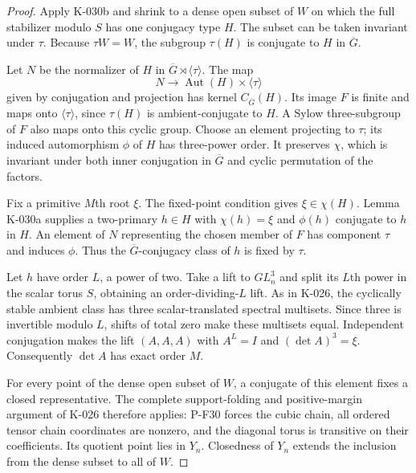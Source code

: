 \begin{proof}
Apply K-030b and shrink to a dense open subset of $W$ on which
the full stabilizer modulo $S$ has one conjugacy type $H$.
The subset can be taken invariant under $\tau$.  Because
$\tau W=W$, the subgroup $\tau(H)$ is conjugate to $H$ in
$\overline G$.

Let $N$ be the normalizer of $H$ in
$\overline G\rtimes\langle\tau\rangle$.  The map
\[
 N\longrightarrow \operatorname{Aut}(H)\times\langle\tau\rangle
\]
given by conjugation and projection has kernel
$C_{\overline G}(H)$.  Its image $F$ is finite and maps onto
$\langle\tau\rangle$, since $\tau(H)$ is ambient-conjugate to
$H$.  A Sylow three-subgroup of $F$ also maps onto this cyclic
group.  Choose an element projecting to $\tau$; its induced
automorphism $\phi$ of $H$ has three-power order.  It preserves
$\chi$, which is invariant under both inner conjugation in
$\overline G$ and cyclic permutation of the factors.

Fix a primitive $M$th root $\xi$.  The fixed-point condition gives
$\xi\in\chi(H)$.  Lemma K-030a supplies a two-primary
$h\in H$ with $\chi(h)=\xi$ and $\phi(h)$ conjugate to $h$ in
$H$.  An element of $N$ representing the chosen member of $F$
has component $\tau$ and induces $\phi$.  Thus the
$\overline G$-conjugacy class of $h$ is fixed by $\tau$.

Let $h$ have order $L$, a power of two.  Take a lift to $GL_n^3$
and split its $L$th power in the scalar torus $S$, obtaining an
order-dividing-$L$ lift.  As in K-026, the cyclically stable
ambient class has three scalar-translated spectral multisets.
Since three is invertible modulo $L$, shifts of total zero make
these multisets equal.  Independent conjugation makes the lift
$(A,A,A)$ with $A^L=I$ and $(\det A)^3=\xi$.  Consequently
$\det A$ has exact order $M$.

For every point of the dense open subset of $W$, a conjugate of
this element fixes a closed representative.  The complete
support-folding and positive-margin argument of K-026 therefore
applies: P-F30 forces the cubic chain, all ordered tensor chain
coordinates are nonzero, and the diagonal torus is transitive
on their coefficients.  Its quotient point lies in $Y_n$.
Closedness of $Y_n$ extends the inclusion from the dense subset
to all of $W$.
\end{proof}

